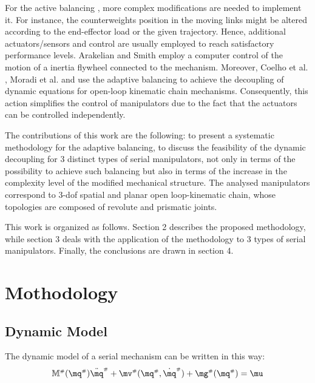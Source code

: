 \documentclass[a4paper,11pt,brazil,fleqn]{article}
\begin{document}
For the active balancing \cite{2arakelian,3seo,11wang,14briot,15coelho,16moradi}, 
more complex modifications are needed to implement it. For instance, the counterweights position in the moving links might be altered
according to the end-effector load or the given trajectory. Hence, 
additional actuators/sensors and control are usually employed to reach satisfactory performance levels. Arakelian and Smith \cite{2arakelian} employ a computer control of the motion of a inertia flywheel connected to the mechanism.
Moreover, Coelho et al. \cite{15coelho}, Moradi et al. \cite{16moradi} and \cite{17arakelian} use the adaptive balancing to achieve the 
decoupling of dynamic equations for open-loop kinematic chain mechanisms. 
Consequently, this action simplifies the control of manipulators due to the fact that the actuators can be controlled independently. 

The contributions of this work are the following: to present a systematic methodology for the adaptive balancing, to discuss the feasibility of the dynamic decoupling for 3 distinct types of serial manipulators, not only in terms of the possibility to achieve such balancing but also in terms of the increase in the complexity level of the modified mechanical structure. The analysed manipulators correspond to 3-dof spatial and planar open loop-kinematic chain, whose topologies are composed of revolute and prismatic joints.

This work is organized as follows. Section 2 describes the proposed methodology, while section 3 deals with the application of the methodology to 3 types of serial manipulators. Finally, the conclusions are drawn in section 4.



\section{Mothodology}\label{S02}

\subsection{Dynamic Model}\label{S02-1}

The dynamic model of a serial mechanism can be written in this way:
\begin{equation}\label{eq:SerialDynamics}
\mM\ssh (\mq\ssh) \ddot{\mq}\ssh + \mv\ssh(\mq\ssh,\dot{\mq}\ssh) + \mg\ssh (\mq\ssh) = \mu
\end{equation}
\end{document}
